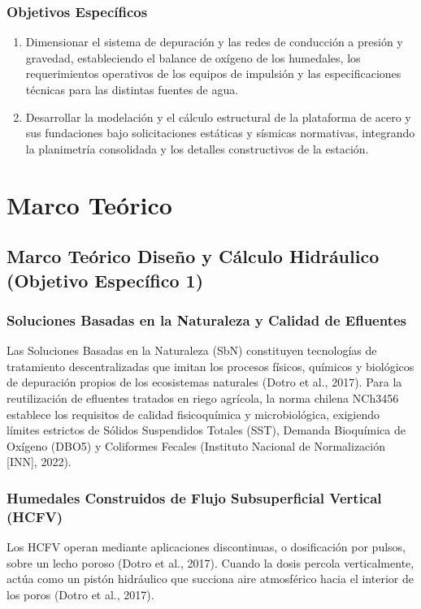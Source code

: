 \documentclass[12pt, letterpaper]{report}
\begin{document}
\subsection{Objetivos Específicos}
\begin{enumerate}
    \item Dimensionar el sistema de depuración y las redes de conducción a presión y gravedad, estableciendo el balance de oxígeno de los humedales, los requerimientos operativos de los equipos de impulsión y las especificaciones técnicas para las distintas fuentes de agua.
    \item Desarrollar la modelación y el cálculo estructural de la plataforma de acero y sus fundaciones bajo solicitaciones estáticas y sísmicas normativas, integrando la planimetría consolidada y los detalles constructivos de la estación.
\end{enumerate}





\chapter{Marco Teórico}

\section{Marco Teórico Diseño y Cálculo Hidráulico (Objetivo Específico 1)}

\subsection{Soluciones Basadas en la Naturaleza y Calidad de Efluentes}
Las Soluciones Basadas en la Naturaleza (SbN) constituyen tecnologías de tratamiento descentralizadas que imitan los procesos físicos, químicos y biológicos de depuración propios de los ecosistemas naturales (Dotro et al., 2017). Para la reutilización de efluentes tratados en riego agrícola, la norma chilena NCh3456 establece los requisitos de calidad fisicoquímica y microbiológica, exigiendo límites estrictos de Sólidos Suspendidos Totales (SST), Demanda Bioquímica de Oxígeno (DBO5) y Coliformes Fecales (Instituto Nacional de Normalización [INN], 2022).

\subsection{Humedales Construidos de Flujo Subsuperficial Vertical (HCFV)}
Los HCFV operan mediante aplicaciones discontinuas, o dosificación por pulsos, sobre un lecho poroso (Dotro et al., 2017). Cuando la dosis percola verticalmente, actúa como un pistón hidráulico que succiona aire atmosférico hacia el interior de los poros (Dotro et al., 2017). 
\end{document}
